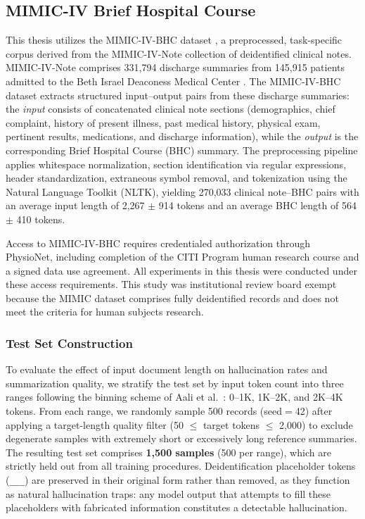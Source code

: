 \documentclass[12pt,a4paper,oneside]{report}
\begin{document}
\subsection{MIMIC-IV Brief Hospital Course}
\label{subsec:mimic-iv}

This thesis utilizes the MIMIC-IV-BHC dataset \cite{aali2024mimic}, a preprocessed, task-specific corpus derived from the MIMIC-IV-Note collection \cite{adams2022mimicbhc} of deidentified clinical notes. MIMIC-IV-Note comprises 331,794 discharge summaries from 145,915 patients admitted to the Beth Israel Deaconess Medical Center \cite{johnson2023mimiciv}. The MIMIC-IV-BHC dataset extracts structured input--output pairs from these discharge summaries: the \textit{input} consists of concatenated clinical note sections (demographics, chief complaint, history of present illness, past medical history, physical exam, pertinent results, medications, and discharge information), while the \textit{output} is the corresponding Brief Hospital Course (BHC) summary. The preprocessing pipeline applies whitespace normalization, section identification via regular expressions, header standardization, extraneous symbol removal, and tokenization using the Natural Language Toolkit (NLTK), yielding 270,033 clinical note--BHC pairs with an average input length of 2,267 $\pm$ 914 tokens and an average BHC length of 564 $\pm$ 410 tokens.

Access to MIMIC-IV-BHC requires credentialed authorization through PhysioNet, including completion of the CITI Program human research course and a signed data use agreement. All experiments in this thesis were conducted under these access requirements. This study was institutional review board exempt because the MIMIC dataset comprises fully deidentified records and does not meet the criteria for human subjects research.

\subsubsection{Test Set Construction}

To evaluate the effect of input document length on hallucination rates and summarization quality, we stratify the test set by input token count into three ranges following the binning scheme of Aali et al.~\cite{aali2024mimic}: 0--1K, 1K--2K, and 2K--4K tokens. From each range, we randomly sample 500 records (seed$=$42) after applying a target-length quality filter (50 $\leq$ target tokens $\leq$ 2,000) to exclude degenerate samples with extremely short or excessively long reference summaries. The resulting test set comprises \textbf{1,500 samples} (500 per range), which are strictly held out from all training procedures. Deidentification placeholder tokens (\texttt{\_\_\_}) are preserved in their original form rather than removed, as they function as natural hallucination traps: any model output that attempts to fill these placeholders with fabricated information constitutes a detectable hallucination.
\end{document}

